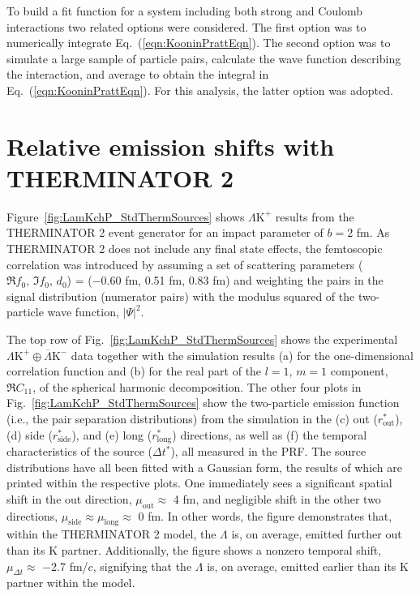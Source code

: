 \documentclass[ALICE,manyauthors]{cernphprep}
\newcommand{\Lam}{$\Lambda$\xspace}
\newcommand{\LamKchP}{$\Lambda\mathrm{K^{+}}$\xspace}
\begin{document}
To build a fit function for a system including both strong and Coulomb interactions two related options were considered. 
The first option was to numerically integrate Eq.~{\color{blue}(}\ref{eqn:KooninPrattEqn}{\color{blue})}.  
The second option was to simulate a large sample of particle pairs, calculate the wave function describing the interaction, and average to obtain the integral in Eq.~{\color{blue}(}\ref{eqn:KooninPrattEqn}{\color{blue})}. 
For this analysis, the latter option was adopted.


\section{Relative emission shifts with THERMINATOR 2}
\label{App:THERM}

Figure~\ref{fig:LamKchP_StdThermSources} shows \LamKchP results from the THERMINATOR 2 event generator for an impact parameter of $b = 2$ fm.
As THERMINATOR 2 does not include any final state effects, the femtoscopic correlation was introduced by assuming a set of scattering parameters ($\Re f_{0},\, \Im f_{0},\, d_{0}$) = ($-$0.60 fm, 0.51 fm, 0.83 fm) and weighting the {\color{blue}pairs in the} signal distribution {\color{red}(numerator pairs)} with the modulus squared of the two-particle wave function, $|\Psi|^{2}$.

The top row of Fig.~\ref{fig:LamKchP_StdThermSources} shows the experimental $\Lambda\mathrm{K}^{+}\oplus\overline{\Lambda}\mathrm{K}^{-}$ data together with the simulation results (a) for the one-dimensional correlation function and (b) for the real part of the $l=1$, $m=1$ component, $\Re C_{11}$, of the spherical harmonic decomposition.
The other four plots in Fig.~\ref{fig:LamKchP_StdThermSources} show the two-particle emission function (i.e., the pair separation distributions) from the simulation in the (c) out ($r^{*}_{\mathrm{out}}$), (d) side ($r^{*}_{\mathrm{side}}$), and (e) long ($r^{*}_{\mathrm{long}}$) directions, as well as (f) the temporal characteristics of the source ($\Delta t^{*}$), all measured in the PRF.
The source distributions have all been fitted with a Gaussian form, the results of which are printed within the respective plots.
One immediately sees a significant spatial shift in the out direction, $\mu_{\mathrm{out}} \approx$ 4 fm, and negligible shift in the other two directions, $\mu_{\mathrm{side}} \approx \mu_{\mathrm{long}} \approx$ 0 fm.
In other words, the figure demonstrates that, within the THERMINATOR 2 model, the \Lam is, on average, emitted further out than its K partner.
Additionally, the figure shows a nonzero temporal shift, $\mu_{\Delta t} \approx$ $-$2.7 fm/$c$, signifying that the \Lam is, on average, emitted earlier than its K partner within the model. 
\end{document}
